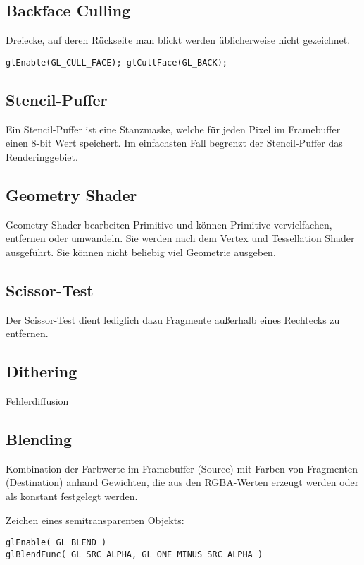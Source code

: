 \documentclass[paper=a4, fontsize=11pt]{scrartcl} %
\numberwithin{equation}{section} %
\numberwithin{figure}{section} %
\numberwithin{table}{section} %
\begin{document}
\subsection{Backface Culling}

Dreiecke, auf deren Rückseite man blickt werden üblicherweise nicht gezeichnet. 
\begin{lstlisting}
glEnable(GL_CULL_FACE); glCullFace(GL_BACK);
\end{lstlisting}

\subsection{Stencil-Puffer}

Ein Stencil-Puffer ist eine Stanzmaske, welche für jeden Pixel im Framebuffer einen 8-bit Wert speichert. Im einfachsten Fall begrenzt der Stencil-Puffer das Renderinggebiet.

\subsection{Geometry Shader}

Geometry Shader bearbeiten Primitive und können Primitive vervielfachen, entfernen oder umwandeln. Sie werden nach dem Vertex und Tessellation Shader ausgeführt. Sie können nicht beliebig viel Geometrie ausgeben.

\subsection{Scissor-Test}

Der Scissor-Test dient lediglich dazu Fragmente außerhalb eines Rechtecks zu entfernen.

\subsection{Dithering}

Fehlerdiffusion


\subsection{Blending}

Kombination der Farbwerte im Framebuffer (Source) mit Farben von Fragmenten (Destination) anhand Gewichten, die aus den RGBA-Werten erzeugt werden oder als konstant festgelegt werden.

Zeichen eines semitransparenten Objekts:
\begin{lstlisting}
glEnable( GL_BLEND )
glBlendFunc( GL_SRC_ALPHA, GL_ONE_MINUS_SRC_ALPHA )
\end{lstlisting}
\end{document}
